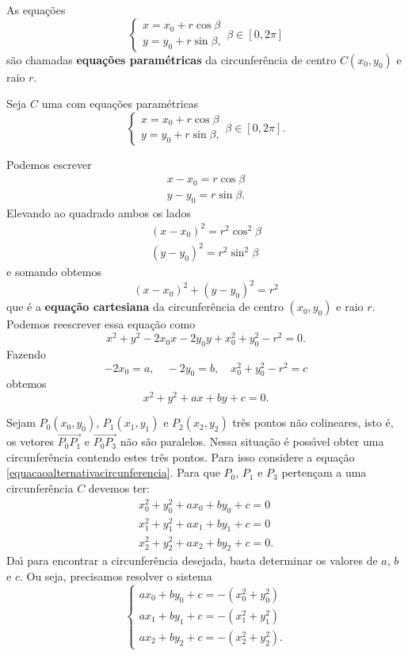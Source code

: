 \begin{definicao}
  As equa\c{c}\~oes
  \[
    \begin{cases}
      x = x_0 + r\cos\beta\\
      y = y_0 + r\sin\beta,
    \end{cases}
    \beta \in [0,2\pi]
  \]
  s\~ao chamadas \textbf{equa\c{c}\~oes param\'etricas} da circunfer\^encia de centro $C(x_0, y_0)$ e raio $r$.
\end{definicao}

Seja $C$ uma com equa\c{c}\~oes param\'etricas
\[
    \begin{cases}
      x = x_0 + r\cos\beta\\
      y = y_0 + r\sin\beta,
    \end{cases}
    \beta \in [0,2\pi].
\]

Podemos escrever
\begin{align*}
  x - x_0 = r\cos\beta\\
  y - y_0 = r\sin\beta.
\end{align*}
Elevando ao quadrado ambos os lados
\begin{align*}
  (x - x_0)^2 = r^2\cos^2\beta\\
  (y - y_0)^2 = r^2\sin^2\beta
\end{align*}
e somando obtemos
\begin{equation}
  (x - x_0)^2 + (y - y_0)^2 = r^2
\end{equation}
que \'e a \textbf{equa\c{c}\~ao cartesiana} da circunfer\^encia de centro $(x_0,y_0)$ e raio $r$.
Podemos reescrever essa equa\c{c}\~ao como
\[
  x^2 + y^2 - 2x_0x - 2y_0y + x_0^2 + y_0^2 - r^2 = 0.
\]
Fazendo
\[
  -2x_0 = a,\quad -2y_0 = b,\quad x_0^2 + y_0^2 - r^2 = c
\]
obtemos
\begin{equation}\label{equacaoalternativacircunferencia}
  x^2 + y^2 + ax + by + c = 0.
\end{equation}

Sejam $P_0(x_0,y_0)$, $P_1(x_1,y_1)$ e $P_2(x_2,y_2)$ tr\^es pontos n\~ao colineares, isto \'e, os vetores $\vec{P_0P_1}$ e $\vec{P_0P_3}$ n\~ao s\~ao paralelos. Nessa situa\c{c}\~ao \'e poss{\'\i}vel obter uma circunfer\^encia contendo estes tr\^es pontos. Para isso considere a equa\c{c}\~ao \eqref{equacaoalternativacircunferencia}. Para que $P_0$, $P_1$ e $P_3$ perten\c{c}am a uma circunfer\^encia $C$ devemos ter:
\begin{align*}
  x_0^2 + y_0^2 + ax_0 + by_0 + c = 0\\
  x_1^2 + y_1^2 + ax_1 + by_1 + c = 0\\
  x_2^2 + y_2^2 + ax_2 + by_2 + c = 0.
\end{align*}
Da{\'\i} para encontrar a circunfer\^encia desejada, basta determinar os valores de $a$, $b$ e $c$. Ou seja, precisamos resolver o sistema
\[
  \begin{cases}
    ax_0 + by_0 + c = -(x_0^2 + y_0^2)\\
    ax_1 + by_1 + c = -(x_1^2 + y_1^2)\\
    ax_2 + by_2 + c = -(x_2^2 + y_2^2).
  \end{cases}
\]

